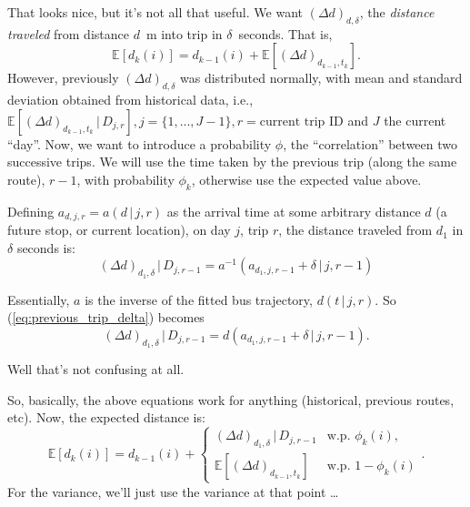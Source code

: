 \documentclass[11pt]{article}\usepackage[]{graphicx}\usepackage[]{color}
\newcommand{\Ex}[1]{\mathbb{E}\left[#1\right]}
\newcommand{\given}{\,|\,}
\begin{document}
That looks nice, but it's not all that useful.
We want $(\Delta d)_{d,\delta}$, 
the \emph{distance traveled} from distance $d$~m into trip in $\delta$~seconds.
That is,
\begin{equation}
  \label{eq:predict-distance}
  \Ex{d_k(i)} = d_{k-1}(i) + \Ex{(\Delta d)_{d_{k-1},t_k}}.
\end{equation}
However, previously $(\Delta d)_{d,\delta}$ was distributed normally,
with mean and standard deviation obtained from historical data, i.e.,
$\Ex{(\Delta d)_{d_{k-1},t_k}\given D_{j,r}}, j = \{1,...,J-1\}, r = \text{current trip ID}$ and $J$
the current ``day''.
Now, we want to introduce a probability $\phi$, the ``correlation'' between two successive trips.
We will use the time taken by the previous trip (along the same route), $r-1$,
with probability $\phi_k$, otherwise use the expected value above.

Defining $a_{d,j,r} = a(d\given j, r)$ as the arrival time at some arbitrary distance $d$ 
(a future stop, or current location), on day $j$, trip $r$,
the distance traveled from $d_1$ in $\delta$ seconds is:
\begin{equation}
  \label{eq:previous_trip_delta}
  (\Delta d)_{d_1,\delta}\given D_{j,r-1} =
  a^{-1}(a_{d_1,j, r-1} + \delta\given j,r-1)
\end{equation}

Essentially, $a$ is the inverse of the fitted bus trajectory, $d(t\given j,r)$.
So (\ref{eq:previous_trip_delta}) becomes
\begin{equation}
  \label{eq:previous_trip_delta_2}
  (\Delta d)_{d_1,\delta}\given D_{j,r-1} =
  d(a_{d_1,j, r-1} + \delta\given j,r-1).
\end{equation}


Well that's not confusing at all.

So, basically, the above equations work for anything (historical, previous routes, etc).
Now, the expected distance is:
\begin{equation}
  \label{eq:expected_hist_prev_}
   \Ex{d_k(i)} = d_{k-1}(i) +
   \begin{cases}
     (\Delta d)_{d_1,\delta}\given D_{j,r-1} & \text{w.p. } \phi_k(i), \\
      \Ex{(\Delta d)_{d_{k-1},t_k}} & \text{w.p. } 1 - \phi_k(i)
   \end{cases}.
\end{equation}
For the variance, we'll just use the variance at that point \ldots
\end{document}
